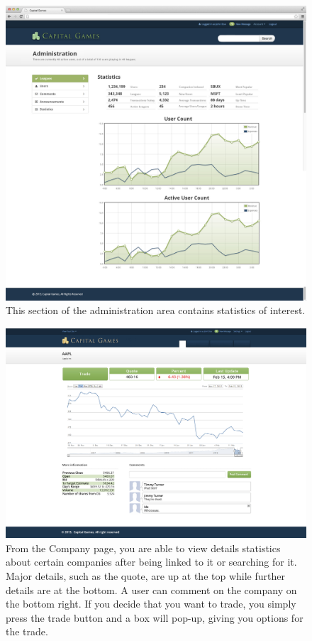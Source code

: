 \begin{figure}
\centering
\includegraphics[width=5.5in]{./mockups/JPEG/adminstatistics.jpg}
\caption{This section of the administration area contains statistics of interest.}
\end{figure}





\begin{figure}
\centering
\includegraphics[width=5.5in]{./mockups/JPEG/company.jpg}
\caption{From the Company page, you are able to view details statistics about certain companies after being linked to it or searching for it. Major details, such as the quote, are up at the top while further details are at the bottom. A user can comment on the company on the bottom right. If you decide that you want to trade, you simply press the trade button and a box will pop-up, giving you options for the trade.}
\end{figure}

